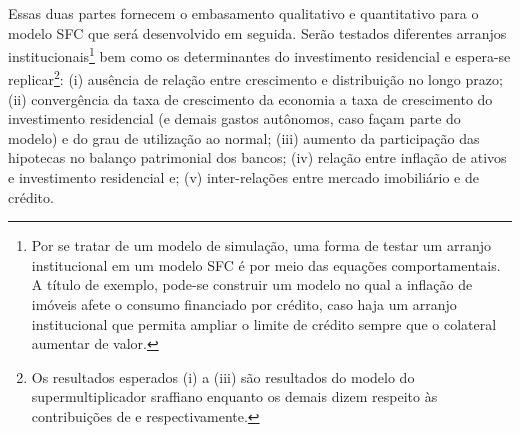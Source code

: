 Essas duas partes fornecem o embasamento qualitativo e quantitativo para o modelo SFC que será desenvolvido em seguida. Serão testados diferentes arranjos institucionais\footnote{Por se tratar de um modelo de simulação, uma forma de testar um arranjo institucional em um modelo SFC é por meio das equações comportamentais. A título de exemplo, pode-se construir um modelo no qual a inflação de imóveis afete o consumo financiado por crédito, caso haja um arranjo institucional que permita ampliar o limite de crédito sempre que o colateral aumentar de valor.} bem como os determinantes do investimento residencial e espera-se replicar\footnote{Os resultados esperados (i) a (iii) são resultados do modelo do supermultiplicador sraffiano enquanto os demais dizem respeito às contribuições de \textcite{teixeira_crescimento_2015} e \textcite{jorda_great_2014} respectivamente.}: 
	(i) ausência de relação entre crescimento e distribuição no longo prazo; 
	(ii) convergência da taxa de crescimento da economia a taxa de crescimento do investimento residencial (e demais gastos autônomos, caso façam parte do modelo) e do grau de utilização ao normal; 
	(iii) aumento da participação das hipotecas no balanço patrimonial dos bancos;
	(iv) relação entre inflação de ativos e investimento residencial e; 
	(v) inter-relações entre mercado imobiliário e de crédito. 


